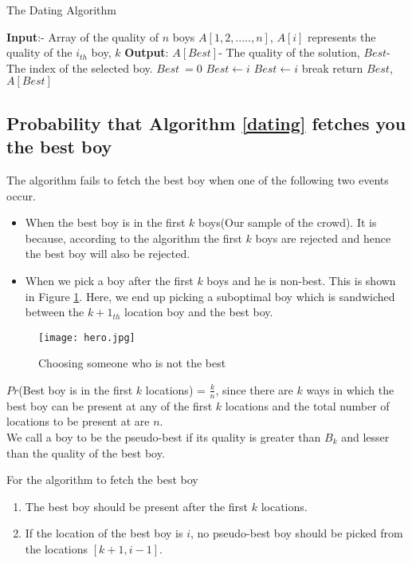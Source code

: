 \documentclass{llncs}
\begin{document}
\begin{algorithm}
\caption{The Dating Algorithm}\label{dating}
\begin{algorithmic}[1]
\State \textbf{Input}:- Array of the quality of $n$ boys $A[1,2,.....,n]$, $A[i]$ represents the quality of the $i_{th}$ boy, $k$
\State \textbf{Output}: $A[Best]$- The quality of the solution, $Best$- The index of the selected boy.
\State $Best\ = 0$
\State $Best \gets i $
\EndIf
\EndFor
{}
\State $Best \gets i$
\State break
\EndIf
\EndFor
\State return $Best$, $A[Best]$
\EndProcedure
\end{algorithmic}
\end{algorithm}

\subsection{Probability that Algorithm \ref{dating} fetches you the best boy}

The algorithm fails to fetch the best boy when one of the following two events occur.
\begin{itemize}
\item When the best boy is in the first $k$ boys(Our sample of the crowd). It is because, according to the algorithm the first $k$ boys are rejected and hence the best boy will also be rejected.  
\item When we pick a boy after the first $k$ boys and he is non-best. This is shown in Figure \ref{hero}. Here, we end up picking a suboptimal boy which is sandwiched between the $k+1_{th}$ location boy and the best boy. 
\end{itemize}

\begin{figure}[h]
\centering
\texttt{[image: hero.jpg]}
\label{hero}
\caption{Choosing someone who is not the best}
\end{figure}

$Pr$(Best boy is in the first $k$ locations) = $ \frac{k}{n}$, since there are $k$ ways in which the best boy can be present at any of the first $k$ locations and the total number of locations to be present at are $n$. \\

We call a boy to be the pseudo-best if its quality is greater than $B_k$ and lesser than the quality of the best boy.
 
For the algorithm to fetch the best boy
\begin{enumerate}
\item The best boy should be present after the first $k$ locations. 
\item If the location of the best boy is $i$, no pseudo-best boy should be picked from the locations $[k+1,i-1]$.
\end{enumerate}
\end{document}
